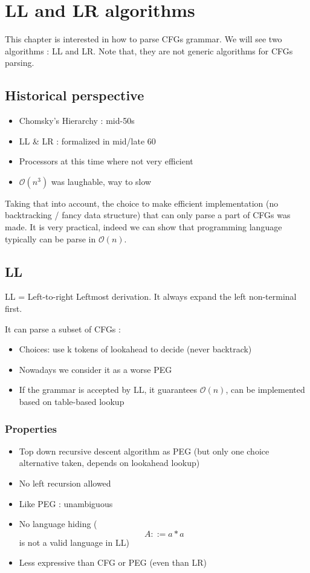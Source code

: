 \chapter{LL and LR algorithms}
\label{chap:ll_and_lr}
This chapter is interested in how to parse CFGs grammar. We will see two
algorithms : LL and LR. Note that, they are not generic algorithms for CFGs
parsing.

\section{Historical perspective}
    \begin{itemize}
        \item Chomsky's Hierarchy : mid-50s
        \item LL \& LR : formalized in mid/late 60
        \item Processors at this time where not very efficient
        \item $\mathcal{O}(n^3)$ was laughable, way to slow
    \end{itemize}

    Taking that into account, the choice to make efficient implementation (no
    backtracking / fancy data structure) that can only parse a part of CFGs was
    made. It is very practical, indeed we can show that programming language
    typically can be parse in $\mathcal{O}(n)$.
\section{LL}
    \theoremstyle{definition}
    \begin{definition}[LL]
        LL = Left-to-right Leftmost derivation. It always expand the left
        non-terminal first.
    \end{definition}
    It can parse a subset of CFGs :
        \begin{itemize}
            \item Choices: use k tokens of lookahead to decide (never backtrack)
            \item Nowadays we consider it as a worse PEG
            \item If the grammar is accepted by LL, it guarantees
            $\mathcal{O}(n)$, can be implemented based on table-based lookup
        \end{itemize}
    \subsection{Properties}
        \begin{itemize}
            \item Top down recursive descent algorithm as PEG (but only one
            choice alternative taken, depends on lookahead lookup)
            \item No left recursion allowed
            \item Like PEG : unambiguous
            \item No language hiding (\[A ::= a* a\] is not a valid language in LL)
            \item Less expressive than CFG or PEG (even than LR)
        \end{itemize}

